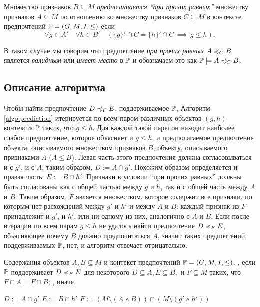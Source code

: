 		\begin{definition}
			Множество признаков $B \subseteq M$ \emph{предпочитается \enquote{при прочих равных}} множеству признаков $A \subseteq M$ по отношению ко множеству признаков $C \subseteq M$ в контексте предпочтений $\mathbb{P} = (G, M, I, \leq)$ если 
			\begin{equation}
			\forall g \in A' \quad \forall h \in B' \quad (\{g\}' \cap C = \{h\}' \cap C \, \implies \, g \leq h).
			\end{equation}
			
			В таком случае мы говорим что предпочтение \emph{при прочих равных} $A \preccurlyeq_{C} B$ является \emph{валидным} или \emph{имеет место} в $\mathbb{P}$ и обозначаем это как $\mathbb{P} \models A \preccurlyeq_{C} B$.
		\end{definition}
	
	\subsection{Описание алгоритма}
	\label{subsec:cp_description}
		Чтобы найти предпочтение $D \preccurlyeq_{F} E$, поддерживаемое $\mathbb{P}$, Алгоритм \ref{algo:prediction} итерируется по всем паром различных объектов $(g, h)$ контекста $\mathbb{P}$ таких, что $g \leq h$. Для каждой такой пары он находит наиболее слабое предпочтение, которое объясняет и $g \leq h$, и предполагаемое предпочтение объекта, описываемого множеством признаков $B$, объекту, описываемого признаками $A$ ($A \leq B$). Левая часть этого предпочтения должна согласовываться и с $g'$, и с $A$; таким образом, $D := A \cap g'$. Похожим образом определяется и правая часть: $E := B \cap h'$. Признаки в условии \enquote{при прочих равных} должны быть согласованы как с общей частью между $g$ и $h$, так и с общей часть между $A$ и $B$. Таким образом, $F$ является множеством, которое содержит все признаки, по которым нет расхождений между $g'$ и $h'$ и между $A$ и $B$: каждый признак из $F$ принадлежит и $g'$, и $h'$, или ни одному из них, аналогично с $A$ и $B$. %
		Если после итерации по всем парам $g \leq h$ не удалось найти предпочтение $D \preccurlyeq_{F} E$, объясняющее почему $B$ должно предпочитаться $A$, значит таких предпочтений, поддерживаемых $\mathbb{P}$, нет, и алгоритм отвечает отрицательно.
	
		\begin{algorithm}
			\caption{$(A, B, \PP)$ \cite[Алг.~1]{Obiedkov:2013}}
			\label{algo:prediction}
			\begin{algorithmic}[1]
				\REQUIRE Содержания объектов $A, B \subseteq M$ и контекст предпочтений $\mathbb{P} = (G, M, I, \leq)$.
				\ENSURE \TRUE, если $\mathbb{P}$ поддерживает $D \preccurlyeq_{F} E$ для некоторого $D \subseteq A, E \subseteq B,$ и $F \subseteq M$ таких, что $F \cap A = F \cap B$; \FALSE, иначе.
				\item[]
				\STATE $D := A \cap g'$
				\STATE $E := B \cap h'$
				\STATE $F := (M \setminus (A \vartriangle B)) \cap (M \setminus (g' \vartriangle h'))$
				\IF{$\PP \models \DEF$}
				\RETURN \TRUE
				\ENDIF
				\ENDFOR
				\ENDFOR
				\RETURN \FALSE
			\end{algorithmic}
		\end{algorithm}
		
